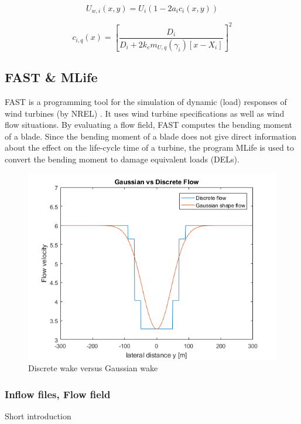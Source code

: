 \begin{equation}
\label{eq:Uw}
U_{w,i}(x,y) = U_i\left( {1-2a_ic_i(x,y)} \right)
\end{equation} 

\begin{equation}
\label{eq:c}
c_{i,q}(x) = \left[ \frac{D_i}{D_i + 2k_em_{U,q}(\gamma_i)[x - X_i]} \right]^2
\end{equation}




\subsection{FAST \& MLife} FAST is a programming tool for the simulation of dynamic (load) responses of wind turbines (by NREL) \cite{Jonkman2005}. It uses wind turbine specifications as well as wind flow situations. By evaluating a flow field, FAST computes the bending moment of a blade. Since the bending moment of a blade does not give direct information about the effect on the life-cycle time of a turbine, the program MLife is used to convert the bending moment to damage equivalent loads (DELs). 

\begin{figure}
  \includegraphics[width=\linewidth]{./Figures/PlotGausDiscWakeDWake180U6yaw0.png} %
  \caption{Discrete wake versus Gaussian wake} %
  \label{fig:disgaus}
\end{figure}

\subsubsection{Inflow files, Flow field}
Short introduction

